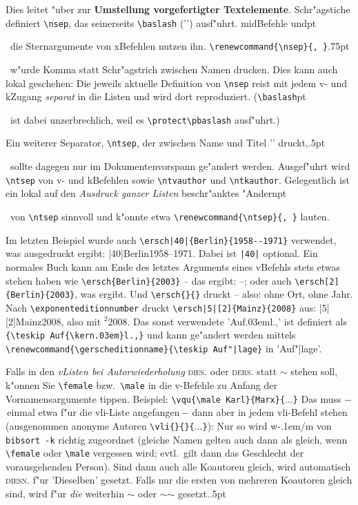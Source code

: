 \documentclass[12pt,a4paper]{article}
\newcommand{\pdfko}[1]{\kern #1pt
                          \strut\ignorespaces}%
\begin{document}
\vspace{1ex}\noindent 
Dies leitet "uber zur \textbf{Umstellung vorgefertigter Textelemente}. 
Schr"agstiche definiert \verb|\nsep|, das seinerseits \verb|\baslash| 
('\baslash') ausf"uhrt. mid\hy Befehle und\pdfko{1}\ 
die Sternargumente von 
x\fhy Befehlen nutzen ihn. \verb*|\renewcommand{\nsep}{, }|\pdfko{.75}\  
w"urde Komma statt Schr"agstrich zwischen Namen drucken. Dies kann 
auch lokal geschehen: Die jeweils aktuelle Definition von \verb|\nsep| reist 
\label{Ausreise} mit jedem v- und k\fhy Zugang \textit{separat} in die Listen  
und wird dort reproduziert. (\verb|\baslash|\pdfko{1.75}\ 
ist dabei unzerbrechlich, weil es \verb|\protect\pbaslash| ausf"uhrt.)

Ein weiterer Separator, \verb|\ntsep|, \label{ntsepA} der zwischen Name und 
Titel '\ntsep' druckt,\pdfko{.5}\ 
sollte dagegen nur im Dokumentenvorspann ge"andert werden. 
Ausgef"uhrt wird \verb|\ntsep| von v- und k\fhy Befehlen 
sowie \verb|\ntvauthor| und \verb|\ntkauthor|. Gelegentlich 
ist ein lokal auf den \textit{Ausdruck ganzer Listen} 
beschr"anktes "Andern\pdfko{1.125}\ 
von \verb|\ntsep| sinnvoll und k"onnte etwa 
\verb*|\renewcommand{\ntsep}{, }| lauten. 

Im letzten Beispiel wurde auch \verb!\ersch|40|{Berlin}{1958--1971}! \label{ersch}
verwendet, was ausgedruckt ergibt: \ersch|40|{Berlin}{1958--1971}.
Dabei ist \verb!|40|! optional. Ein normales Buch kann am Ende des
letztes Arguments eines v\fhy Befehls stets etwas stehen haben wie
\verb!\ersch{Berlin}{2003}! -- das ergibt: \ersch{Berlin}{2003} --; 
oder auch \verb!\ersch[2]{Berlin}{2003}!, was \ersch[2]{Berlin}{2003} 
ergibt. Und \verb!\ersch{}{}! druckt \ersch{}{} -- also: ohne Ort, ohne
Jahr. Nach \verb|\exponenteditionnumber| druckt
\verb!\ersch|5|[2]{Mainz}{2008}! aus: {\exponenteditionnumber
\ersch|5|[2]{Mainz}{2008}}, also mit $^{2}2008$. Das sonst verwendete 
'Auf{\kern.03em}l.,' ist definiert als \verb|{\teskip Auf{\kern.03em}l.,}| 
und kann ge"andert werden mittels
\verb+\renewcommand{\gerscheditionname}{\teskip Auf"|lage}+ in 'Auf"|lage'.


\vspace{1.25ex}\label{female}\noindent
Falls in den \textit{v\fhy Listen bei Autorwiederholung} \textsc{dies.} 
oder \textsc{ders.} statt $\sim$ stehen soll, k"onnen Sie \verb|\female|
bzw.\ \verb|\male| in die v-Befehle zu Anfang der Vornamensargumente
tippen. Beispiel: \verb|\vqu{\male Karl}{Marx}{|...\verb|}| Das muss $-$\,einmal
etwa f"ur die vli-Liste angefangen\,$-$ dann aber in jedem vli-Befehl stehen
(ausgenommen anonyme Autoren \verb|\vli{}{}{|...\verb|}|): Nur so wird w\kern-.1em/m von 
\hspace{.2em}\verb|bibsort -k|\hspace{.2em} richtig zugeordnet (gleiche Namen 
gelten auch dann als gleich, wenn \verb|\female| oder \verb|\male| vergessen
wird; evtl.\ gilt dann das Geschlecht der vorausgehenden Person). 
Sind dann auch alle Koautoren gleich, wird automatisch \textsc{diesn.} 
f"ur 'Dieselben' gesetzt. Falls nur die ersten von mehreren Koautoren gleich sind, 
wird f"ur \textit{die} weiterhin {\small$\sim$} oder {\small$\sim$\baslash$\sim$} 
gesetzt.\pdfko{.5}  
\end{document}
